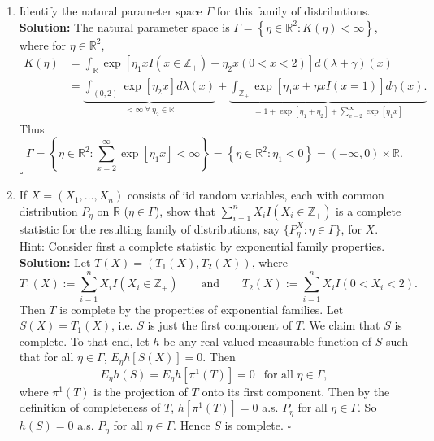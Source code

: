\documentclass[12pt]{article}
\newcounter{ProofCounter}
\newenvironment{Solution}{\stepcounter{ProofCounter}\textbf{Solution:}}{\hfill$\square$}
\begin{document}
\begin{enumerate}[leftmargin=0cm, itemindent=0cm]
\begin{enumerate}
\item Identify the natural parameter space $\Gamma$  for this family of distributions.\\

  \begin{Solution}
    The natural parameter space is $\Gamma = \left\{ \eta \in \mathbb{R}^{2} : K(\eta) < \infty \right\}$, where for $\eta \in \mathbb{R}^{2}$,
    \begin{align*}
      K(\eta) & = \int_{\mathbb{R}}\exp\left[ \eta_1 xI(x \in \mathbb{Z}_+) + \eta_2 x \left( 0 < x < 2\right)\right]d(\lambda + \gamma)(x) \\
      & = \underbrace{\int_{(0,2)}\exp\left[ \eta_2x \right]d\lambda(x)}_{< \infty \ \forall \ \eta_2 \in \mathbb{R}} + 
      \underbrace{\int_{\mathbb{Z}_+}\exp\left[ \eta_1x + \eta xI(x = 1) \right]d\gamma(x). }_{ = 1 + \exp\left[ \eta_1 + \eta_2 \right] +
      \sum_{x=2}^{\infty}\exp[\eta_1x]}
    \end{align*}
    Thus 
    \[ 
      \Gamma = \left\{ \eta \in \mathbb{R}^{2} : \sum_{x=2}^{\infty}\exp\left[ \eta_1 x \right] < \infty \right\} = 
      \left\{ \eta \in \mathbb{R}^{2} : \eta_1 < 0 \right\} = (-\infty, 0) \times \mathbb{R}.
    \]
  \end{Solution}


\item If $X=(X_1,\ldots,X_n)$ consists of iid random variables, each with common distribution $P_\eta$ on $ \mathbb{R}$ ($\eta \in \Gamma$), show that $\sum_{i=1}^n X_i I(X_i \in \mathbb{Z}_+)$ is a complete statistic for the resulting family of distributions, say $\{P^X_\eta: \eta \in \Gamma\}$, for $X$.\\
Hint: Consider first a complete statistic by exponential family properties. \\

\begin{Solution}
  Let $T(X) = (T_1(X), T_2(X))$, where 
  \[
    T_1(X) := \sum_{i=1}^{n}X_iI(X_i \in \mathbb{Z}_+) \qquad \text{and} \qquad T_2(X) := \sum_{i=1}^{n}X_iI(0 < X_i < 2).
  \]
  Then $T$ is complete by the properties of exponential families. Let $S(X) = T_1(X)$, i.e. $S$ is just the first component of $T$. We claim that $S$
  is complete. To that end, let $h$ be any real-valued measurable function of $S$ such that for all $\eta \in \Gamma$, $E_{\eta}h[S(X)] = 0$. Then 
  \[
    E_{\eta}h(S) = E_{\eta}h[\pi^{1}(T)] = 0 \ \ \text{ for all } \eta \in \Gamma,
  \]
  where $\pi^{1}(T)$ is the projection of $T$ onto its first component. Then by the definition of completeness of $T$, $h[\pi^{1}(T)] = 0$ a.s.
  $P_{\eta}$ for all $\eta \in \Gamma$.
  So $h(S) = 0$ a.s. $P_{\eta}$ for all $\eta \in \Gamma$. Hence $S$ is complete.
\end{Solution}


\end{enumerate}
\end{enumerate}
\end{document}
